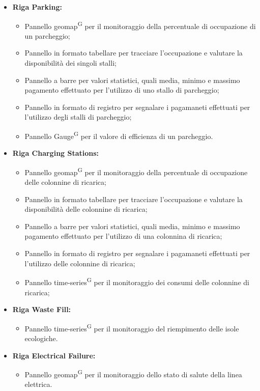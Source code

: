 \documentclass[8pt]{article}
\newcommand{\glossterm}[1]{#1\textsuperscript{G}} %
\begin{document}
\begin{itemize}
	\setlength\itemsep{0em}
    \item \textbf{Riga Parking:}
    \begin{itemize}
	\setlength\itemsep{0em}
        \item Pannello \glossterm{geomap} per il monitoraggio della percentuale di occupazione di un parcheggio;
        \item Pannello in formato tabellare per tracciare l'occupazione e valutare la disponibilità dei singoli stalli;
        \item Pannello a barre per valori statistici, quali media, minimo e massimo pagamento effettuato per l'utilizzo di uno stallo di parcheggio;
        \item Pannello in formato di registro per segnalare i pagamaneti effettuati per l'utilizzo degli stalli di parcheggio;
        \item Pannello \glossterm{Gauge} per il valore di efficienza di un parcheggio.
    \end{itemize}
    \item \textbf{Riga Charging Stations:}
    \begin{itemize}
	\setlength\itemsep{0em}
        \item Pannello \glossterm{geomap} per il monitoraggio della percentuale di occupazione delle colonnine di ricarica;
        \item Pannello in formato tabellare per tracciare l'occupazione e valutare la disponibilità delle colonnine di ricarica;
        \item Pannello a barre per valori statistici, quali media, minimo e massimo pagamento effettuato per l'utilizzo di una colonnina di ricarica;
        \item Pannello in formato di registro per segnalare i pagamaneti effettuati per l'utilizzo delle colonnine di ricarica;
        \item Pannello \glossterm{time-series} per il monitoraggio dei consumi delle colonnine di ricarica;
    \end{itemize}
    \item \textbf{Riga Waste Fill:}
    \begin{itemize}
	\setlength\itemsep{0em}
        \item Pannello \glossterm{time-series} per il monitoraggio del riempimento delle isole ecologiche.
    \end{itemize}
    \item \textbf{Riga Electrical Failure:}
    \begin{itemize}
	\setlength\itemsep{0em}
        \item Pannello \glossterm{geomap} per il monitoraggio dello stato di salute della linea elettrica.
    \end{itemize}
\end{itemize}
\end{document}
